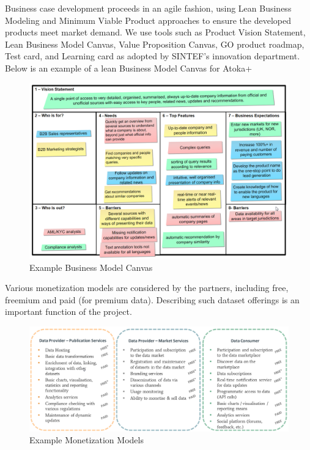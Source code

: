\documentclass[runningheads,a4paper]{llncs}
\makeatletter
\def\maxwidth#1{\ifdim\Gin@nat@width>#1 #1\else\Gin@nat@width\fi}
\makeatother
\begin{document}
Business case development proceeds in an agile fashion, using Lean Business Modeling and Minimum Viable Product approaches to ensure the developed products meet market demand. We use tools such as Product Vision Statement, Lean Business Model Canvas, Value Proposition Canvas, GO product roadmap, Test card, and Learning card as adopted by SINTEF's innovation department. Below is an example of a lean Business Model Canvas  \cite{_Ref491191527} for Atoka+
\begin{figure}[h!]
\centering
\includegraphics[width=\maxwidth{\textwidth}]{img/1000020100000587000003BF364A10B37D5D07AF.png}
\cprotect\caption{Example Business Model Canvas}
\label{}
\end{figure}


Various monetization models are considered by the partners, including free, freemium and paid (for premium data). Describing such dataset offerings is an important function of the project.
\begin{figure}[h!]
\centering
\includegraphics[width=\maxwidth{\textwidth}]{img/10000000000006E1000002CB60A462E360BF762E.png}
\cprotect\caption{Example Monetization Models}
\label{}
\end{figure}
\end{document}
